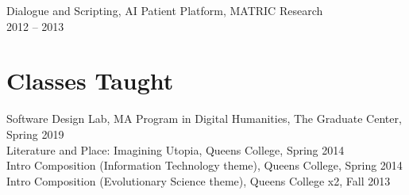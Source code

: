 \documentclass[11pt]{article}
\begin{document}
Dialogue and Scripting, AI Patient Platform, MATRIC Research\\
2012 – 2013\\

\section*{Classes Taught}
\label{sec:orgheadline11}

Software Design Lab, MA Program in Digital Humanities, The Graduate Center, Spring 2019\\
Literature and Place: Imagining Utopia, Queens College, Spring 2014\\
Intro Composition (Information Technology theme), Queens College, Spring 2014\\
Intro Composition (Evolutionary Science theme), Queens College  x2, Fall 2013\\
\end{document}
